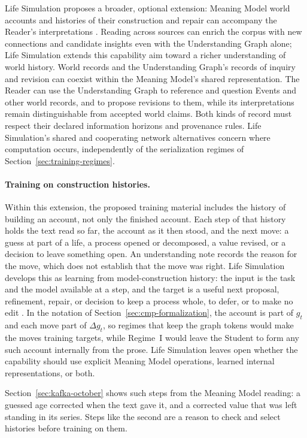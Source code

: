 \documentclass[11pt]{article}
\begin{document}
Life Simulation proposes a broader, optional extension: Meaning Model world accounts
and histories of their construction and repair can accompany the Reader's
interpretations \cite{westerbergLifeSimulation2026}. Reading across sources can
enrich the corpus with new connections and candidate insights even with the
Understanding Graph alone; Life Simulation extends this capability aim toward
a richer understanding of world history. World records and the Understanding
Graph's records of inquiry and revision can coexist within the Meaning Model's
shared representation. The Reader can use the Understanding Graph to reference
and question Events and other world records, and to propose revisions to them,
while its interpretations remain distinguishable from accepted world claims.
Both kinds of record must respect their declared information horizons and
provenance rules. Life Simulation's shared and cooperating network alternatives
concern where computation occurs, independently of the serialization regimes
of Section~\ref{sec:training-regimes}.

\paragraph{Training on construction histories.}\label{sec:training-construction}
Within this extension, the proposed training material includes the history of
building an account, not only the finished account. Each step of that history
holds the text read so far, the account as it then stood, and the next move: a
guess at part of a life, a process opened or decomposed, a value revised, or a
decision to leave something open. An understanding note records the reason for
the move, which does not establish that the move was right. Life Simulation
develops this as learning from model-construction history: the input is the task
and the model available at a step, and the target is a useful next proposal,
refinement, repair, or decision to keep a process whole, to defer, or to make no
edit \cite{westerbergLifeSimulation2026}. In the notation of
Section~\ref{sec:cmp-formalization}, the account is
part of $g_t$ and each move part of $\Delta g_t$, so regimes that keep the graph
tokens would make the moves training targets, while Regime~I would leave the
Student to form any such account internally from the prose. Life Simulation
leaves open whether the capability should use explicit Meaning Model operations,
learned internal representations, or both.

Section~\ref{sec:kafka-october} shows such steps from the Meaning Model reading:
a guessed age corrected when the text gave it, and a corrected value that was
left standing in its series. Steps like the second are a reason to check and
select histories before training on them.
\end{document}
